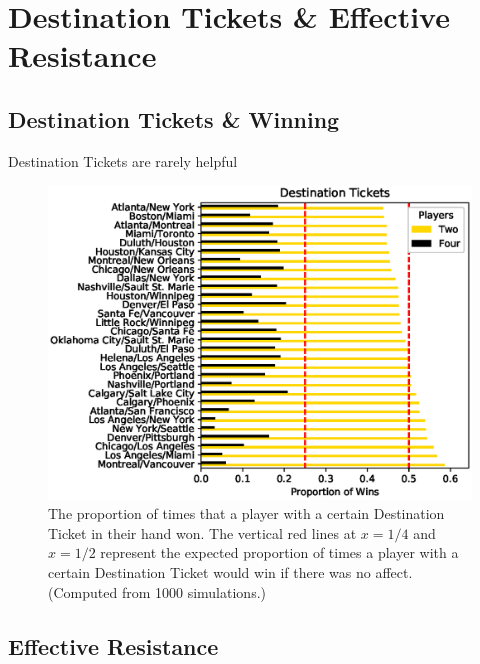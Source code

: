 \section{Destination Tickets \& Effective Resistance}

\subsection{Destination Tickets \& Winning}
Destination Tickets are rarely helpful
\begin{figure}[!ht]
\centering
\includegraphics[scale=.8]{figures/destination_tickets}
\caption{The proportion of times that a player with a certain
Destination Ticket in their hand won.
The vertical red lines at $x=1/4$ and $x=1/2$ represent
the expected proportion of times a player with a certain Destination Ticket
would win if there was no affect. (Computed from 1000 simulations.)}
\label{fig:tickets}
\end{figure}

\subsection{Effective Resistance}

